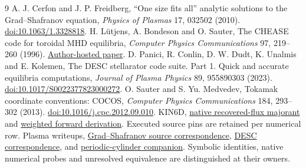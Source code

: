 \documentclass[10pt,a4paper]{article}
\begin{document}
\begin{thebibliography}{9}\small
{}
A. J. Cerfon and J. P. Freidberg, ``One size fits all'' analytic solutions to
the Grad--Shafranov equation, \emph{Physics of Plasmas} 17, 032502 (2010).
\href{https://doi.org/10.1063/1.3328818}{doi:10.1063/1.3328818}.
H. L\"utjens, A. Bondeson and O. Sauter, The CHEASE code for toroidal MHD
equilibria, \emph{Computer Physics Communications} 97, 219--260 (1996).
\href{https://crppwww.epfl.ch/~sauter/chease/Lutjens_CHEASE_CPC96_OS.pdf}{Author-hosted paper}.
D. Panici, R. Conlin, D. W. Dudt, K. Unalmis and E. Kolemen,
The DESC stellarator code suite. Part 1. Quick and accurate equilibria computations,
\emph{Journal of Plasma Physics} 89, 955890303 (2023).
\href{https://doi.org/10.1017/S0022377823000272}{doi:10.1017/S0022377823000272}.
O. Sauter and S. Yu. Medvedev, Tokamak coordinate conventions: COCOS,
\emph{Computer Physics Communications} 184, 293--302 (2013).
\href{https://doi.org/10.1016/j.cpc.2012.09.010}{doi:10.1016/j.cpc.2012.09.010}.
KIN6D, \href{https://github.com/itpplasma/kin6d/blob/99fa2c8/src/gs_majorant.f90}{native recovered-flux majorant}
and \href{https://github.com/itpplasma/kin6d/blob/99fa2c8/theory/derivations/grad-shafranov-forward-majorant.md}{weighted forward derivation}.
Executed source pins are retained per numerical row.
Plasma writeups, \href{https://github.com/itpplasma/writeups/blob/fabe925/theory/gs_solver_source_correspondence.md}{Grad--Shafranov source correspondence},
\href{https://github.com/itpplasma/writeups/blob/fabe925/theory/desc_equilibrium_source_correspondence.md}{DESC correspondence}, and
\href{https://github.com/itpplasma/writeups/blob/fabe925/theory/periodic_cylinder_correspondence.md}{periodic-cylinder companion}.
Symbolic identities, native numerical probes and unresolved equivalence are
distinguished at their owners.
\end{thebibliography}
\end{document}
